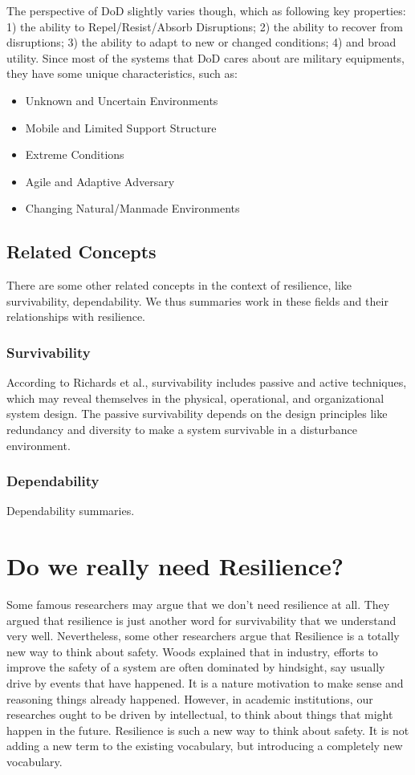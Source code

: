 \documentclass[11pt]{article}
\begin{document}
The perspective of DoD slightly varies though, which as following key properties: 1) the ability to Repel/Resist/Absorb Disruptions; 2) the ability to recover from disruptions; 3) the ability to adapt to new or changed conditions; 4) and broad utility. Since most of the systems that DoD cares about are military equipments, they have some unique characteristics, such as:
\begin{itemize}
\item Unknown and Uncertain Environments
\item Mobile and Limited Support Structure
\item Extreme Conditions
\item Agile and Adaptive Adversary
\item Changing Natural/Manmade Environments
\end{itemize}

\subsection{Related Concepts}
There are some other related concepts in the context of resilience, like survivability, dependability. We thus summaries work in these fields and their relationships with resilience.

\subsubsection{Survivability}
According to Richards et al., survivability includes passive and active techniques, which may reveal themselves in the physical, operational, and organizational system design. The passive survivability depends on the design principles like redundancy and diversity to make a system survivable in a disturbance environment. 

\subsubsection{Dependability}
Dependability summaries.


\section{Do we really need Resilience?}
Some famous researchers may argue that we don't need resilience at all. They argued that resilience is just another word for survivability that we understand very well. Nevertheless, some other researchers argue that Resilience is a totally new way to think about safety. Woods \cite{Woods2006} explained that in industry, efforts to improve the safety of a system are often dominated by hindsight, say usually drive by events that have happened. It is a nature motivation to make sense and reasoning things already happened. However, in academic institutions, our researches ought to be driven by intellectual, to think about things that might happen in the future. Resilience is such a new way to think about safety. It is not adding a new term to the existing vocabulary, but introducing a completely new vocabulary.
\end{document}
